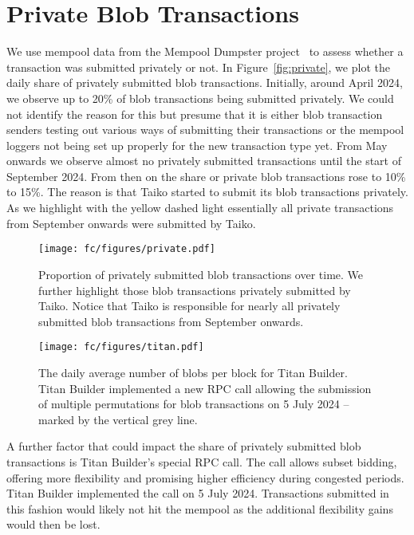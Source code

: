 \section{Private Blob Transactions}
\label{app:private}

We use mempool data from the Mempool Dumpster project~\parencite{flashbots2024mempool} to assess whether a transaction was submitted privately or not. In Figure~\ref{fig:private}, we plot the daily share of privately submitted blob transactions. Initially, around April 2024, we observe up to 20\% of blob transactions being submitted privately. We could not identify the reason for this but presume that it is either blob transaction senders testing out various ways of submitting their transactions or the mempool loggers not being set up properly for the new transaction type yet. From May onwards we observe almost no privately submitted transactions until the start of September 2024. From then on the share or private blob transactions rose to 10\% to 15\%. The reason is that Taiko started to submit its blob transactions privately. As we highlight with the yellow dashed light essentially all private transactions from September onwards were submitted by Taiko.  

\begin{figure}[h]
\centering

\begin{minipage}[t]{.48\linewidth}
    \texttt{[image: fc/figures/private.pdf]}
    \caption{Proportion of privately submitted blob transactions over time. We further highlight those blob transactions privately submitted by Taiko. Notice that Taiko is responsible for nearly all privately submitted blob transactions from September onwards.}
    \label{fig:private}
\end{minipage}
\hfill
\begin{minipage}[t]{.48\linewidth}
     \texttt{[image: fc/figures/titan.pdf]}
    \caption{The daily average number of blobs per block for Titan Builder. Titan Builder implemented a new RPC call allowing the submission of multiple permutations for blob transactions on 5 July 2024 -- marked by the vertical grey line.  }
    \label{fig:titan}
\end{minipage}
\end{figure}

A further factor that could impact the share of privately submitted blob transactions is Titan Builder's special RPC call. The call allows subset bidding, offering more flexibility and promising higher efficiency during congested periods. Titan Builder implemented the call on 5 July 2024. Transactions submitted in this fashion would likely not hit the mempool as the additional flexibility gains would then be lost. 

